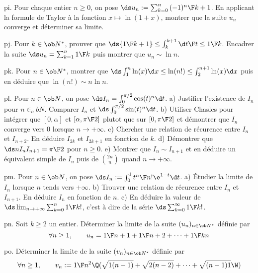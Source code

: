 \exo [Level=1,Fight=0,Learn=0,Field=\Intégration,Type=\Exercices,Origin=] pi. 
Pour chaque entier $n\ge0$, on pose $\ds u_n:=\sum_{k=0}^n{(-1)^n\F k+1}$. En applicant la formule de Taylor à la fonction $x\mapsto\ln(1+x)$, montrer que la suite $u_n$ converge et déterminer sa limite. 

\exo [Level=1,Fight=1,Learn=1,Field=\Intégration,Type=\Exercices,Origin=] pj. 
Pour $k\in\ob N^*$, prouver que $\ds{1\F k+1}\le \int_k^{k+1}{\d t\F t}\le {1\F k}$. 
Encadrer la suite $\ds u_n=\sum_{k=1}^n{1\F k}$ puis montrer que $u_n\sim \ln n$. 

\exo [Level=1,Fight=2,Learn=2,Field=\Intégration,Type=\Exercices,Origin=,Indication={Commencer par encadrer l'intégrale $\ds\int_k^{k+1}\ln(x)\d x$.} ]  pk. 
Pour $n\in\ob N^*$, montrer que $\ds \int_1^n\ln (x)\d x\le\ln(n!)\le \int_2^{n+1}\ln(x)\d x$ puis en déduire que $\ln(n!)\sim n\ln n$. \pn


\exo [Level=1,Fight=3,Learn=3,Field=\Intégration,Type=\Exercices,Origin=]  pl. 
Pour $n\in\ob N$, on pose $\ds I_n=\int_0^{\pi/2}\cos(t)^n\d t$. \pn
a) Justifier l'existence de $I_n$ pour $n\in_ob N$. Comparer $I_n$ et $\ds \int_0^{\pi/2}\sin(t)^n\d t$. \pn
b) Utiliser Chasles pour intégrer que $[0,\alpha]$ et $[\alpha,{\pi\F2}]$ plutot que sur $[0,{\pi\F 2}]$ et 
démontrer que $I_n$ converge vers $0$ lorsque $n\to+\infty$. \pn
c) Chercher une relation de récurence entre $I_n$ et $I_{n+2}$. En déduire $I_{2k}$ et $I_{2k+1}$ en fonction de $k$. \pn
d) Démontrer que $\ds nI_nI_{n+1}={\pi\F 2}$ pour $n\ge0$. \pn
e) Montrer que $I_n\sim I_{n+1}$ et en déduire un équivalent simple de $I_n$ puis de ${2n \choose n}$ quand $n\to+\infty$. 

\exo [Level=1,Fight=2,Learn=2,Field=\Intégration,Type=\Exercices,Origin=] pm. 
Pour $n\in\ob N$, on pose $\ds I_n:=\int_0^1{t^n\F n!}\e^{1-t}\d t$. \pn
a) Étudier la limite de $I_n$ lorsque $n$ tends vers $+\infty$. \pn
b) Trouver une relation de récurence entre $I_n$ et $I_{n+1}$. En déduire $I_n$ en fonction de $n$. \pn
c) En déduire la valeur de $\ds\lim_{n\to+\infty}\sum_{k=0}^n{1\F k!}$, c'est à dire de la série $\ds\sum_{k=0}^\infty{1\F k!}$. 

\exo [Level=1,Fight=1,Learn=1,Field=\Suites,Type=\Exercices,Origin=] pn. 
Soit $k\ge2$ un entier. Déterminer la limite de la suite $(u_n)_{n\in\ob N^*}$ définie par 
$$
\forall n\ge1, \qquad u_n={1\F n+1}+{1\F n+2}+\cdots+{1\F kn}
$$

\exo [Level=1,Fight=1,Learn=1,Field=\Suites,Type=\Exercices,Origin=] po. 
Déterminer la limite de la suite $(v_n)_{n\in\ob N^*}$ définie par 
$$
\forall n\ge1, \qquad v_n:={1\F n^2}\Q(\sqrt{1(n-1)}+\sqrt{2(n-2)}+\cdots+\sqrt{(n-1)1}\W)
$$

